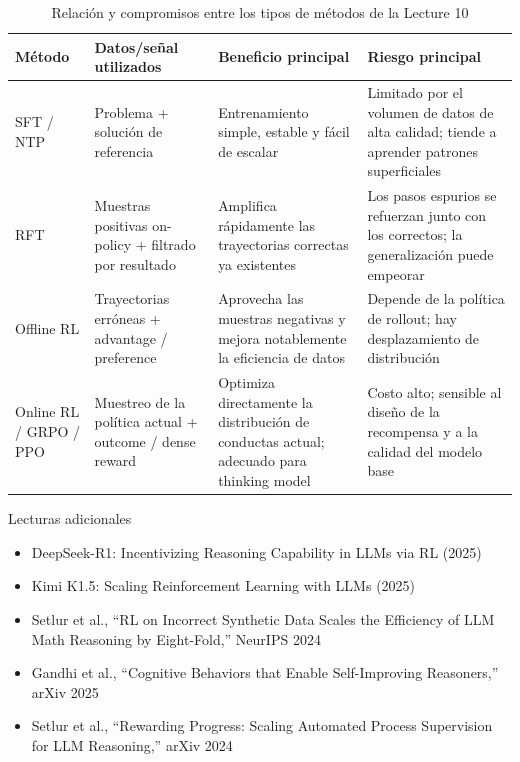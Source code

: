 \documentclass[a4paper]{article}
\begin{document}
\begin{table}[H]
\centering
\begin{tabular}{p{} p{} p{} p{}}
\toprule
Método & Datos/señal utilizados & Beneficio principal & Riesgo principal \\
\midrule
SFT / NTP & Problema + solución de referencia & Entrenamiento simple, estable y fácil de escalar & Limitado por el volumen de datos de alta calidad; tiende a aprender patrones superficiales \\
RFT & Muestras positivas on-policy + filtrado por resultado & Amplifica rápidamente las trayectorias correctas ya existentes & Los pasos espurios se refuerzan junto con los correctos; la generalización puede empeorar \\
Offline RL & Trayectorias erróneas + advantage / preference & Aprovecha las muestras negativas y mejora notablemente la eficiencia de datos & Depende de la política de rollout; hay desplazamiento de distribución \\
Online RL / GRPO / PPO & Muestreo de la política actual + outcome / dense reward & Optimiza directamente la distribución de conductas actual; adecuado para thinking model & Costo alto; sensible al diseño de la recompensa y a la calidad del modelo base \\
\bottomrule
\end{tabular}
\caption{Relación y compromisos entre los tipos de métodos de la Lecture 10}
\end{table}

\begin{knowledgebox}{Lecturas adicionales}
\begin{itemize}
    \item DeepSeek-R1: Incentivizing Reasoning Capability in LLMs via RL (2025)
    \item Kimi K1.5: Scaling Reinforcement Learning with LLMs (2025)
    \item Setlur et al., ``RL on Incorrect Synthetic Data Scales the Efficiency of LLM Math Reasoning by Eight-Fold,'' NeurIPS 2024
    \item Gandhi et al., ``Cognitive Behaviors that Enable Self-Improving Reasoners,'' arXiv 2025
    \item Setlur et al., ``Rewarding Progress: Scaling Automated Process Supervision for LLM Reasoning,'' arXiv 2024
\end{itemize}
\end{knowledgebox}
\end{document}
